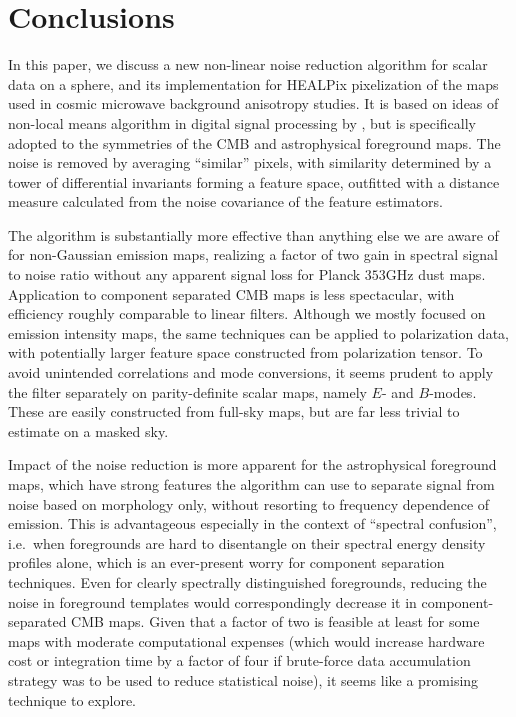 \documentclass{aa}
\begin{document}
\section{Conclusions}
\label{sec:conclusion}

In this paper, we discuss a new non-linear noise reduction algorithm for scalar data on a sphere, and its implementation for HEALPix pixelization of the maps used in cosmic microwave background anisotropy studies. It is based on ideas of non-local means algorithm in digital signal processing by \cite{Buades:2005}, but is specifically adopted to the symmetries of the CMB and astrophysical foreground maps. The noise is removed by averaging ``similar'' pixels, with similarity determined by a tower of differential invariants forming a feature space, outfitted with a distance measure calculated from the noise covariance of the feature estimators.

The algorithm is substantially more effective than anything else we are aware of for non-Gaussian emission maps, realizing a factor of two gain in spectral signal to noise ratio without any apparent signal loss for Planck $353$GHz dust maps. Application to component separated CMB maps is less spectacular, with efficiency roughly comparable to linear filters. Although we mostly focused on emission intensity maps, the same techniques can be applied to polarization data, with potentially larger feature space constructed from polarization tensor. To avoid unintended correlations and mode conversions, it seems prudent to apply the filter separately on parity-definite scalar maps, namely $E$- and $B$-modes. These are easily constructed from full-sky maps, but are far less trivial to estimate on a masked sky.

Impact of the noise reduction is more apparent for the astrophysical foreground maps, which have strong features the algorithm can use to separate signal from noise based on morphology only, without resorting to frequency dependence of emission. This is advantageous especially in the context of ``spectral confusion'', i.e.\ when foregrounds are hard to disentangle on their spectral energy density profiles alone, which is an ever-present worry for component separation techniques. Even for clearly spectrally distinguished foregrounds, reducing the noise in foreground templates would correspondingly decrease it in component-separated CMB maps. Given that a factor of two is feasible at least for some maps with moderate computational expenses (which would increase hardware cost or integration time by a factor of four if brute-force data accumulation strategy was to be used to reduce statistical noise), it seems like a promising technique to explore.
\end{document}
